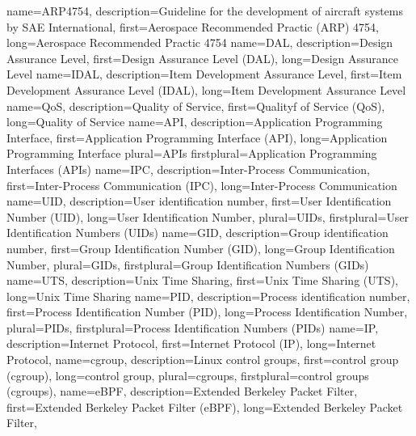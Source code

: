 {%
    name={ARP4754},
    description={Guideline for the development of aircraft systems by SAE International},
    first={Aerospace Recommended Practic (ARP) 4754},
    long={Aerospace Recommended Practic 4754}
}
{%
    name={DAL},
    description={Design Assurance Level},
    first={Design Assurance Level (DAL)},
    long={Design Assurance Level}
}
{%
    name={IDAL},
    description={Item Development Assurance Level},
    first={Item Development Assurance Level (IDAL)},
    long={Item Development Assurance Level}
}
{%
    name={QoS},
    description={Quality of Service},
    first={Qualityf of Service (QoS)},
    long={Quality of Service}
}
{%
    name={API},
    description={Application Programming Interface},
    first={Application Programming Interface (API)},
    long={Application Programming Interface}
    plural={APIs}
    firstplural={Application Programming Interfaces (APIs)}
}
{%
    name={IPC},
    description={Inter-Process Communication},
    first={Inter-Process Communication (IPC)},
    long={Inter-Process Communication}
}
{%
    name={UID},
    description={User identification number},
    first={User Identification Number (UID)},
    long={User Identification Number},
    plural={UIDs},
    firstplural={User Identification Numbers (UIDs)}
}
{%
    name={GID},
    description={Group identification number},
    first={Group Identification Number (GID)},
    long={Group Identification Number},
    plural={GIDs},
    firstplural={Group Identification Numbers (GIDs)}
}
{%
    name={UTS},
    description={Unix Time Sharing},
    first={Unix Time Sharing (UTS)},
    long={Unix Time Sharing}
}
{%
    name={PID},
    description={Process identification number},
    first={Process Identification Number (PID)},
    long={Process Identification Number},
    plural={PIDs},
    firstplural={Process Identification Numbers (PIDs)}
}
{%
    name={IP},
    description={Internet Protocol},
    first={Internet Protocol (IP)},
    long={Internet Protocol},
}
{%
    name={cgroup},
    description={Linux control groups},
    first={control group (cgroup)},
    long={control group},
    plural={cgroups},
    firstplural={control groups (cgroups)},
}
{%
    name={eBPF},
    description={Extended Berkeley Packet Filter},
    first={Extended Berkeley Packet Filter (eBPF)},
    long={Extended Berkeley Packet Filter},
}
